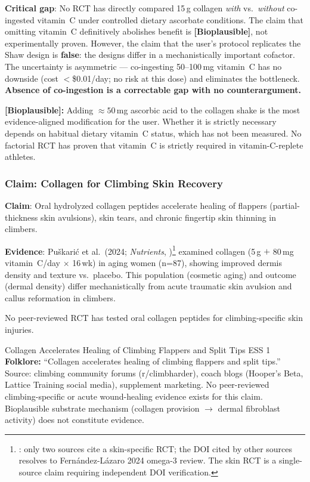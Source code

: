 \textbf{Critical gap}: No RCT has directly compared 15\,g collagen \textit{with} vs.\ \textit{without} co-ingested vitamin~C under controlled dietary ascorbate conditions. The claim that omitting vitamin~C definitively abolishes benefit is \textbf{[Bioplausible]}, not experimentally proven. However, the claim that the user's protocol replicates the Shaw design is \textbf{false}: the designs differ in a mechanistically important cofactor. The uncertainty is asymmetric --- co-ingesting 50--100\,mg vitamin~C has no downside (cost $<$\$0.01/day; no risk at this dose) and eliminates the bottleneck. \textbf{Absence of co-ingestion is a correctable gap with no counterargument.}

\textbf{[Bioplausible]:} Adding ${\approx}50$\,mg ascorbic acid to the collagen shake is the most evidence-aligned modification for the user. Whether it is strictly necessary depends on habitual dietary vitamin~C status, which has not been measured. No factorial RCT has proven that vitamin~C is strictly required in vitamin-C-replete athletes.

\subsubsection{Claim: Collagen for Climbing Skin Recovery}

\textbf{Claim}: Oral hydrolyzed collagen peptides accelerate healing of flappers (partial-thickness skin avulsions), skin tears, and chronic fingertip skin thinning in climbers.

\textbf{Evidence}: Pu\v{s}kari\'c et al.\ (2024; \textit{Nutrients}, \cite{FLAGA+24})\footnote{\toverify: only two sources cite a skin-specific RCT; the DOI cited by other sources resolves to Fern\'andez-L\'azaro 2024 omega-3 review. The skin RCT is a single-source claim requiring independent DOI verification.} examined collagen (5\,g $+$ 80\,mg vitamin~C/day $\times$ 16\,wk) in aging women (n=87), showing improved dermis density and texture vs.\ placebo. This population (cosmetic aging) and outcome (dermal density) differ mechanistically from acute traumatic skin avulsion and callus reformation in climbers.

No peer-reviewed RCT has tested oral collagen peptides for climbing-specific skin injuries.

\begin{folklorebox}{Collagen Accelerates Healing of Climbing Flappers and Split Tips \cdot \folkloreverified \cdot ESS 1}
\textbf{Folklore:} ``Collagen accelerates healing of climbing flappers and split tips.'' Source: climbing community forums (r/climbharder), coach blogs (Hooper's Beta, Lattice Training social media), supplement marketing. No peer-reviewed climbing-specific or acute wound-healing evidence exists for this claim. Bioplausible substrate mechanism (collagen provision $\to$ dermal fibroblast activity) does not constitute evidence.
\end{folklorebox}

